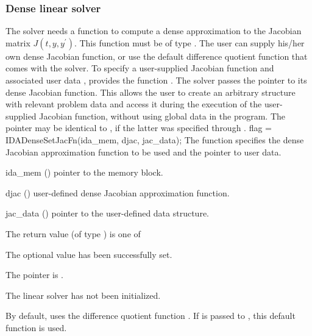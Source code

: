 {\subsubsection{Dense linear solver}\label{sss:optin_dense}
The 
{\idadense} solver needs a function to compute a dense approximation to
the Jacobian matrix $J(t,y,y^\prime)$.  
This function must be of type . 
The user can supply his/her own dense Jacobian function, or use the default 
difference quotient function  
that comes with the {\idadense} solver.
To specify a user-supplied Jacobian function  and associated user 
data , {\idadense} provides the function .
The {\idadense} solver passes the pointer  
to its dense Jacobian function. This allows the user to
create an arbitrary structure with relevant problem data and access it
during the execution of the user-supplied Jacobian function, without
using global data in the program.  The pointer  may be
identical to , if the latter was specified through .
{
  flag = IDADenseSetJacFn(ida\_mem, djac, jac\_data);
}
{
  The function  specifies the dense Jacobian
  approximation function to be used and the pointer to user data.
}
{
  \begin{args}
  \item[ida\_mem] ()
    pointer to the {\ida} memory block.
  \item[djac] ()
    user-defined dense Jacobian approximation function.
  \item[jac\_data] ()
    pointer to the user-defined data structure.
  \end{args}
}
{
  The return value  (of type ) is one of
  \begin{args}
  \item[\Id{IDADENSE\_SUCCESS}] 
    The optional value has been successfully set.
  \item[\Id{IDADENSE\_MEM\_NULL}]
    The  pointer is .
  \item[\Id{IDADENSE\_LMEM\_NULL}]
    The {\idadense} linear solver has not been initialized.
  \end{args}
}
{
  By default, {\idadense} uses the difference quotient function .
  If  is passed to , this default function is used.

}}
